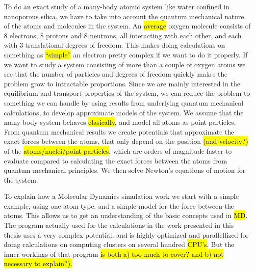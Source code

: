 To do an exact study of a many-body atomic system like water confined in nanoporous silica, we have to take into account the quantum mechanical nature of the atoms and molecules in the system. An \hl{average} oxygen molecule consists of 8 electrons, 8 protons and 8 neutrons, all interacting with each other, and each with 3 translational degrees of freedom. This makes doing calculations on something as \hl{``simple''} an electron pretty complex if we want to do it properly. If we want to study a system consisting of more than a couple of oxygen atoms we see that the number of particles and degrees of freedom quickly makes the problem grow to intractable proportions. Since we are mainly interested in the equilibrium and transport properties of the system, we can reduce the problem to something we can handle by using results from underlying quantum mechanical calculations, to develop approximate models of the system. We assume that the many-body system behaves \hl{clasically}, and model all atoms as point particles. From quantum mechanical results we create potentials that approximate the exact forces between the atoms, that only depend on the position \hl{(and velocity?)} of the \hl{atoms/nuclei/point particles}, which are orders of magnitude faster to evaluate compared to calculating the exact forces between the atoms from quantum mechanical principles. We then solve Newton's equations of motion for the system.

To explain how a Molecular Dynamics simulation work we start with a simple example, using one atom type, and a simple model for the force between the atoms. This allows us to get an understanding of the basic concepts used in \hl{MD}. The program actually used for the calculations in the work presented in this thesis uses a very complex potential, and is highly optimized and parallellized for doing calculations on computing clusters on several hundred \hl{CPU's}. But the inner workings of that program \hl{is both a) too much to cover? and b) not necessary to explain?).}
